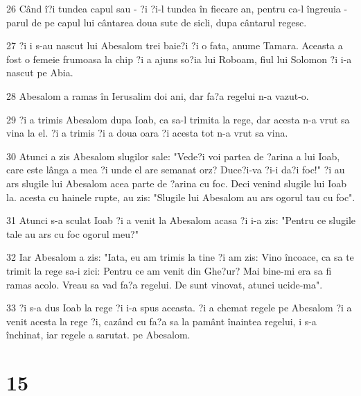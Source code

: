 \par 26 Când î?i tundea capul sau - ?i ?i-l tundea în fiecare an, pentru ca-l îngreuia - parul de pe capul lui cântarea doua sute de sicli, dupa cântarul regesc.
\par 27 ?i i s-au nascut lui Abesalom trei baie?i ?i o fata, anume Tamara. Aceasta a fost o femeie frumoasa la chip ?i a ajuns so?ia lui Roboam, fiul lui Solomon ?i i-a nascut pe Abia.
\par 28 Abesalom a ramas în Ierusalim doi ani, dar fa?a regelui n-a vazut-o.
\par 29 ?i a trimis Abesalom dupa Ioab, ca sa-l trimita la rege, dar acesta n-a vrut sa vina la el. ?i a trimis ?i a doua oara ?i acesta tot n-a vrut sa vina.
\par 30 Atunci a zis Abesalom slugilor sale: "Vede?i voi partea de ?arina a lui Ioab, care este lânga a mea ?i unde el are semanat orz? Duce?i-va ?i-i da?i foc!" ?i au ars slugile lui Abesalom acea parte de ?arina cu foc. Deci venind slugile lui Ioab la. acesta cu hainele rupte, au zis: "Slugile lui Abesalom au ars ogorul tau cu foc".
\par 31 Atunci s-a sculat Ioab ?i a venit la Abesalom acasa ?i i-a zis: "Pentru ce slugile tale au ars cu foc ogorul meu?"
\par 32 Iar Abesalom a zis: "Iata, eu am trimis la tine ?i am zis: Vino încoace, ca sa te trimit la rege sa-i zici: Pentru ce am venit din Ghe?ur? Mai bine-mi era sa fi ramas acolo. Vreau sa vad fa?a regelui. De sunt vinovat, atunci ucide-ma".
\par 33 ?i s-a dus Ioab la rege ?i i-a spus aceasta. ?i a chemat regele pe Abesalom ?i a venit acesta la rege ?i, cazând cu fa?a sa la pamânt înaintea regelui, i s-a închinat, iar regele a sarutat. pe Abesalom.

\chapter{15}

